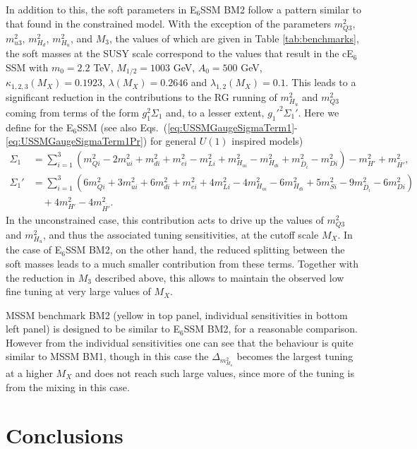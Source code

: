 \documentclass[preprint,amsmath,amssymb,aps,superscriptaddress,prd,showpacs,floatfix,nofootinbib]{revtex4-1}
\begin{document}
In addition to this, the soft parameters in E$_6$SSM BM2 follow a pattern similar to that found in the constrained
model. With the exception of the parameters $m_{Q3}^2$, 
$m_{u3}^2$, $m_{H_d}^2$, $m_{H_u}^2$, and $M_3$, the values of which are given in Table \ref{tab:benchmarks}, 
the soft masses at the SUSY scale correspond to the values that result in the cE$_6$SSM with $m_0=2.2$ TeV, 
$M_{1/2}=1003$ GeV, $A_0=500$ GeV, $\kappa_{1,2,3}(M_X)=0.1923$, $\lambda(M_X)=0.2646$ and
$\lambda_{1,2}(M_X)=0.1$. This leads to a significant reduction in the contributions to the RG running of $m_{H_u}^2$ and $m_{Q3}^2$ coming from terms of the form $g_1^2\Sigma_1$ and, to a lesser extent, $g_1'^2\Sigma_1'$. Here we define for the E$_6$SSM (see also Eqs.~(\ref{eq:USSMGaugeSigmaTerm1}-\ref{eq:USSMGaugeSigmaTerm1Pr}) for general $U(1)$ inspired models)
\begin{align*}
\Sigma_1&=\sum_{i=1}^3\left ( m_{Qi}^2-2m_{ui}^2+m_{di}^2+m_{ei}^2-m_{Li}^2+m_{H_{ui}}^2-m_{H_{di}}^2+m_{\overline{D}_i}^2-m_{Di}^2\right )-m_{H'}^2+m_{\overline{H'}}^2,\\
\Sigma_1'&=\sum_{i=1}^3\left ( 6m_{Qi}^2+3m_{ui}^2+6m_{di}^2+m_{ei}^2+4m_{Li}^2-4m_{H_{ui}}^2-6m_{H_{di}}^2+5m_{Si}^2-9m_{\overline{D}_i}^2-6m_{Di}^2\right )\\
&\quad{}+4m_{H'}^2-4m_{\overline{H'}}^2.
\end{align*}
In the unconstrained case, this contribution acts to drive up the values of $m_{Q3}^2$ and $m_{H_u}^2$, and thus the associated tuning sensitivities, at the cutoff scale $M_X$. In the case of E$_6$SSM BM2, on the other hand, the reduced splitting between the soft masses leads to a much smaller contribution from these terms. Together with the reduction in $M_3$ described above, this allows to maintain the observed low fine tuning at very large values of $M_X$.

MSSM benchmark BM2 (yellow in top panel, individual sensitivities in bottom left panel) is designed to be similar to E$_6$SSM BM2, for a reasonable comparison.  However from the individual sensitivities one can see that the behaviour is quite similar to MSSM BM1, though in this case the $\Delta_{m_{H_u}^2}$ becomes the largest tuning at a higher $M_X$ and does not reach such large values, since more of the tuning is from the mixing in this case.

\section{\label{sec:conclusion}Conclusions}
\end{document}
